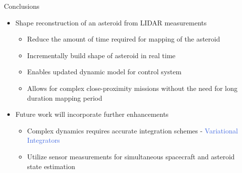 \documentclass[final, usenames, dvipsnames]{beamer}
\newlength{\onecolwidth}
\def\Emph{\textcolor{RoyalBlue}}
\begin{document}
\begin{frame}[t]
\begin{columns}[T,onlytextwidth]
\begin{column}{\onecolwidth}
\begin{block}{Conclusions} %
    \begin{itemize}
        \item Shape reconstruction of an asteroid from LIDAR measurements
            \begin{itemize}
                \item Reduce the amount of time required for mapping of the asteroid
                \item Incrementally build shape of asteroid in real time
                \item Enables updated dynamic model for control system
                \item Allows for complex close-proximity missions without the need for long duration mapping period
            \end{itemize}
        \item Future work will incorporate further enhancements
            \begin{itemize}
                \item Complex dynamics requires accurate integration schemes - \Emph{Variational Integrators}
                \item Utilize sensor measurements for simultaneous spacecraft and asteroid state estimation
            \end{itemize}
    \end{itemize}
\end{block} %
\end{column}  %

\end{columns} %
\end{frame} %
\end{document}
